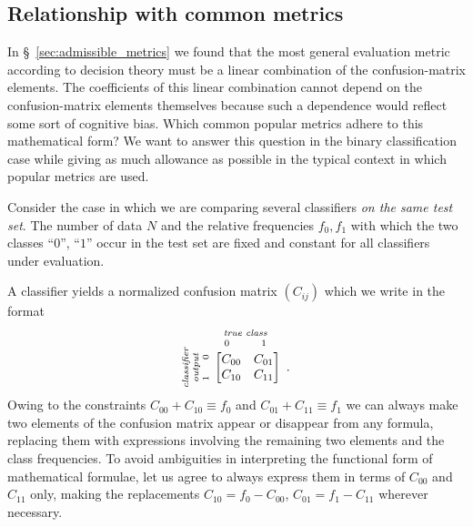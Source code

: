 \documentclass[\ifafour a4paper,12pt,\else a5paper,10pt,\fi%
onecolumn,oneside,article,%
british%
]{memoir}
\theoremstyle{remark}
\theoremstyle{innote}
\renewcommand*{\|}[1][]{\nonscript\:#1\vert\nonscript\:\mathopen{}}
\newcommand*{\sect}{\S}%
\begin{document}
\subsection{Relationship with common metrics}
\label{sec:common_metrics}

In \sect~\ref{sec:admissible_metrics} we found that the most general evaluation metric according to decision theory must be a linear combination of the confusion-matrix elements. The coefficients of this linear combination cannot depend on the confusion-matrix elements themselves because such a dependence would reflect some sort of cognitive bias. Which common popular metrics adhere to this mathematical form? We want to answer this question in the binary classification case while giving as much allowance as possible in the typical context in which popular metrics are used.

Consider the case in which we are comparing several classifiers \emph{on the same test set}. The number of data $N$ and the relative frequencies $f_{0}, f_{1}$ with which the two classes \enquote{$0$}, \enquote{$1$} occur in the test set are fixed and constant for all classifiers under evaluation.

A classifier yields a normalized confusion matrix $(C_{ij})$ which we write in the format
\begin{equation*}
  \rotatebox[origin=c]{90}{
    \clap{\textit{\parbox{5em}{\centering\scriptsize classifier\\output\\$1\hspace{1.5em}0$}}
    }}\ 
    \overbracket[0pt]{
      \begin{bmatrix} C_{00} & C_{01} \\ C_{10} & C_{11}
      \end{bmatrix}}^{
      \clap{\textit{\parbox{6em}{\centering\scriptsize true class\\$0\hspace{3em}1$}}
    }} \ .
\end{equation*}

Owing to the constraints $C_{00} + C_{10} \equiv f_{0}$ and $C_{01} + C_{11} \equiv f_{1}$ we can always make two elements of the confusion matrix appear or disappear from any formula, replacing them with expressions involving the remaining two elements and the class frequencies. To avoid ambiguities in interpreting the functional form of mathematical formulae, let us agree to always express them in terms of $C_{00}$ and $C_{11}$ only, making the replacements $C_{10} = f_{0} - C_{00}$, $C_{01} = f_{1} - C_{11}$ wherever necessary.
\end{document}
